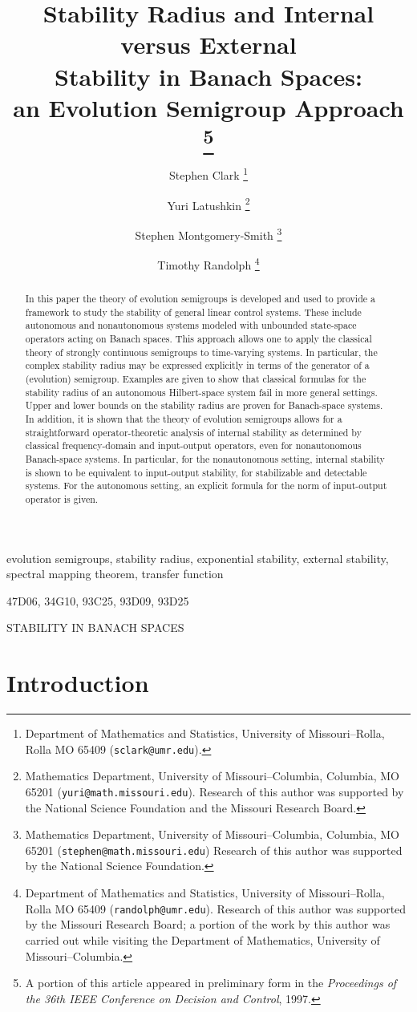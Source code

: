 \documentclass[10pt,psamsfonts,leqno]{siamltex}
\title{Stability Radius and Internal versus
External\\ Stability in Banach Spaces:\\
an Evolution Semigroup Approach
\thanks{A portion of this article
appeared in preliminary form in the {\em Proceedings of the 36th IEEE
Conference on
Decision and Control}, 1997. }}
\author{Stephen Clark
\thanks{Department of Mathematics and Statistics, University of
Missouri--Rolla, Rolla MO 65409 ({\tt sclark@umr.edu}).}
\and Yuri Latushkin
\thanks{Mathematics Department, University of
Missouri--Columbia, Columbia, MO 65201
({\tt yuri@math.missouri.edu}).
Research of this author was supported by the National Science
Foundation and the Missouri Research Board.}
\and Stephen Montgomery-Smith
\thanks{Mathematics Department,
University of Missouri--Columbia, Columbia, MO 65201
({\tt stephen@math.missouri.edu}) Research of this author was
supported by the National Science Foundation.}
\and Timothy Randolph
\thanks{Department of Mathematics
and Statistics, University of Missouri--Rolla, Rolla MO 65409
({\tt randolph@umr.edu}). Research of this author was supported by
the Missouri Research Board; a portion of the work by this author
was carried out while visiting the Department of Mathematics,
University of Missouri--Columbia.}}
\begin{document}
\maketitle

\begin{abstract}
In this paper the theory of evolution semigroups is developed and
used to provide a framework  to study the stability of general linear
control
systems. These include  autonomous and nonautonomous systems modeled
with unbounded
state-space operators acting on Banach spaces.  This approach allows
 one to apply the classical theory of strongly continuous semigroups to
time-varying  systems.  In particular, the complex stability radius may
be expressed explicitly in terms of the generator of a
(evolution) semigroup.  Examples are given to show that classical
formulas  for the stability radius of an autonomous Hilbert-space system
fail in more general settings. Upper and lower bounds on the stability
radius are proven for  Banach-space systems.  In addition, it is
shown that the theory of evolution semigroups allows for a
straightforward
operator-theoretic analysis of internal stability as determined by
classical frequency-domain and input-output operators, even for
nonautonomous Banach-space systems. In particular, for the nonautonomous
setting,
internal stability is shown to be equivalent to input-output stability,
for stabilizable and detectable systems.  For the autonomous setting,
an explicit formula for the norm of input-output operator is given.
\end{abstract}

\begin{keywords}
evolution semigroups, stability radius, exponential stability,
external stability, spectral mapping theorem,
transfer function

\end{keywords}

\begin{AMS}
47D06, 34G10, 93C25, 93D09, 93D25
\end{AMS}



\pagestyle{myheadings}
\thispagestyle{empty}
{STABILITY IN BANACH SPACES}

\section{Introduction}
\end{document}
